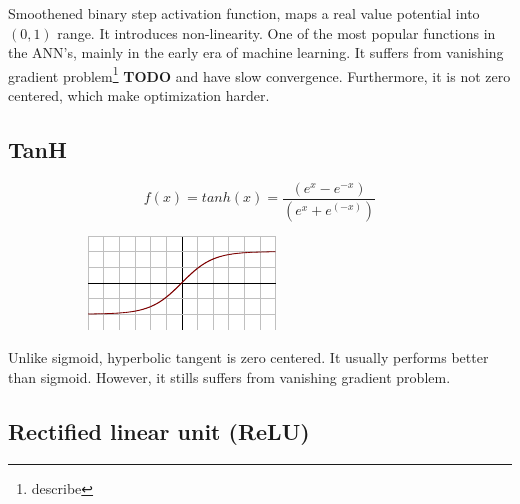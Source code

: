 \noindent
Smoothened binary step activation function, maps a real value potential into $(0,1)$ range. It introduces non-linearity. One of the most popular functions in the ANN's, mainly in the early era of machine learning. It suffers from vanishing gradient problem\footnote{describe} \textbf{TODO} and have slow convergence. Furthermore, it is not zero centered, which make optimization harder.
 
\subsection*{TanH}

\begin{figure}[H]
\raggedright
\begin{subfigure}{.5\textwidth}
  \centering
  \[ f(x) = tanh(x) = \frac{(e^x - e^{-x})}{(e^x + e^{(-x)})} \]
\end{subfigure}%
\begin{subfigure}{.25\textwidth}
  \centering
  \includegraphics[width=\textwidth]{tex/images/activation/tanh}
\end{subfigure}
\end{figure}

\noindent
Unlike sigmoid, hyperbolic tangent is zero centered. It usually performs better than sigmoid. However, it stills suffers from vanishing gradient problem.

\subsection*{Rectified linear unit (ReLU)}

